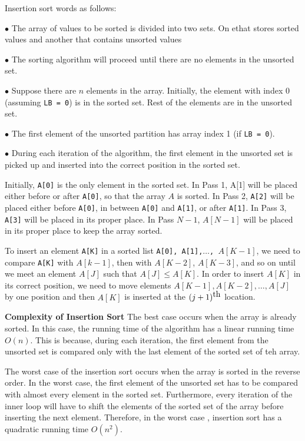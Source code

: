 \vskip 1mm
Insertion sort words as follows:

\vskip 3mm
\qquad$\bullet$ The array of values to be sorted is divided into two sets. On ethat stores sorted values and another that contains unsorted values

\vskip 3mm
\qquad$\bullet$ The sorting algorithm will proceed until there are no elements in the unsorted set.

\vskip 3mm
\qquad$\bullet$ Suppose there are $n$ elements in the array. Initially, the element with index 0 (assuming {\tt LB = 0}) is in the sorted set. Rest of the elements are in the unsorted set.

\vskip 3mm
\qquad$\bullet$ The first element of the unsorted partition has array index 1 (if {\tt LB = 0}).

\vskip 3mm
\qquad$\bullet$ During each iteration of the algorithm, the first element in the unsorted set is picked up and inserted into the correct position in the sorted set.

\vskip 3mm
Initially, {\tt A[0]} is the only element in the sorted set. In Pass 1, {A[1]} will be placed either before or after {\tt A[0]}, so that the array $A$ is sorted. In Pass 2, {\tt A[2]} will be placed either before {\tt A[0]}, in between {\tt A[0]} and {\tt A[1]}, or after {\tt A[1]}. In Pass 3, {\tt A[3]} will be placed in its proper place. In Pass $N-1$, $A[N-1]$ will be placed in its proper place to keep the array sorted.

\vskip 1mm
To insert an element {\tt A[K]} in a sorted list {\tt A[0], A[1],$\ldots$, $A[K-1]$}, we need to compare {\tt A[K]} with $A[k-1]$, then with $A[K-2]$, $A[K-3]$, and so on until we meet an element $A[J]$ such that $A[J]\leq A[K]$. In order to insert $A[K]$ in its correct position, we need to move elements $A[K-1],A[K-2],\ldots,A[J]$ by one position and then $A[K]$ is inserted at the $(j+1)^{\hbox{th}}$ location.

\vskip 3mm
{\bf Complexity of Insertion Sort}
\vskip 1mm
The best case occurs when the array is already sorted. In this case, the running time of the algorithm has a linear running time $O(n)$. This is because, during each iteration, the first element from the unsorted set is compared only with the last element of the sorted set of teh array.

\vskip 1mm
The worst case of the insertion sort occurs when the array is sorted in the reverse order. In the worst case, the first element of the unsorted set has to be compared with almost every element in the sorted set. Furthermore, every iteration of the inner loop will have to shift the elements of the sorted set of the array before inserting the next element. Therefore, in the worst case , insertion sort has a quadratic running time $O(n^2)$.

